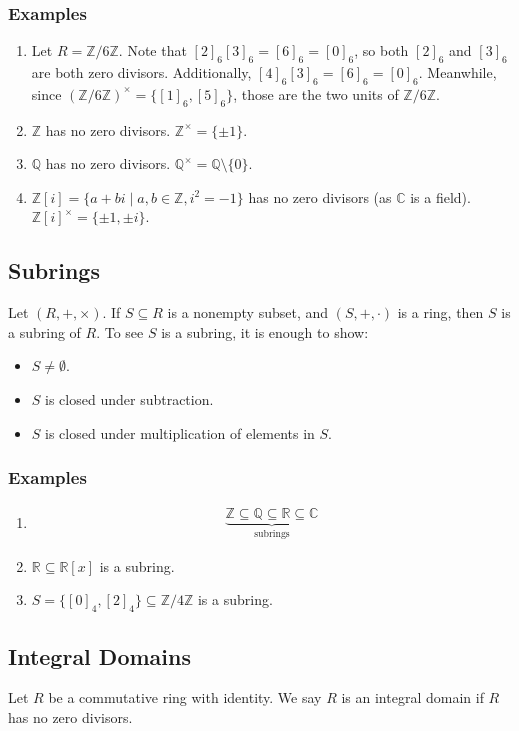 \documentclass[8pt]{extarticle}
\newcommand{\Q}{\mathbb{Q}}
\newcommand{\Z}{\mathbb{Z}}
\newcommand{\R}{\mathbb{R}}
\newcommand{\C}{\mathbb{C}}
\begin{document}
    \subsubsection{Examples}%
  \begin{enumerate}[(1)]
    \item Let $R = \Z/6\Z$. Note that $[2]_6 [3]_{6} = [6]_{6} = [0]_{6}$, so both $[2]_6$ and $[3]_{6}$ are both zero divisors. Additionally, $[4]_6[3]_6 = [6]_{6} = [0]_{6}$. Meanwhile, since $(\Z/6\Z)^{\times}=\{[1]_{6},[5]_{6}\}$, those are the two units of $\Z/6\Z$.
    \item $\Z$ has no zero divisors. $\Z^{\times} = \{\pm 1\}$.
    \item $\Q$ has no zero divisors. $\Q^{\times} = \Q\setminus \{0\}$.
    \item $\Z[i] = \{a+bi\mid a,b\in\Z,i^2=-1\}$ has no zero divisors (as $\mathbb{C}$ is a field). $\Z[i]^{\times} = \{\pm 1,\pm i\}$.
  \end{enumerate}
  \subsection{Subrings}%
  Let $(R,+,\times)$. If $S\subseteq R$ is a nonempty subset, and $(S,+,\cdot)$ is a ring, then $S$ is a subring of $R$. To see $S$ is a subring, it is enough to show:
  \begin{itemize}
    \item $S\neq \emptyset$.
    \item $S$ is closed under subtraction.
    \item $S$ is closed under multiplication of elements in $S$.
  \end{itemize}
  \subsubsection{Examples}%
  \begin{enumerate}[(1)]
    \item 
    \begin{align*}
      \underbrace{\Z\subseteq\Q\subseteq\R\subseteq \C}_{\text{subrings}}
    \end{align*}
  \item $\R\subseteq \R[x]$ is a subring.
  \item $S = \{[0]_4,[2]_4\}\subseteq \Z/4\Z$ is a subring.
  \end{enumerate}
  \subsection{Integral Domains}%
  Let $R$ be a commutative ring with identity. We say $R$ is an integral domain if $R$ has no zero divisors.
\end{document}
